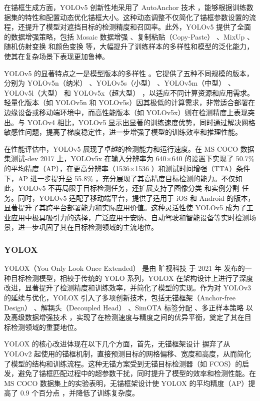 \documentclass[11pt,twocolumn]{ctexart}
\begin{document}
在锚框生成方面，YOLOv5 创新性地采用了 AutoAnchor 技术 ，能够根据训练数据集的特性和配置动态优化锚框大小。这种动态调整不仅简化了锚框参数设置的流程，还提升了模型对遮挡目标的检测精度和召回率。此外，YOLOv5 提供了全面的数据增强策略，包括 Mosaic 数据增强 、复制粘贴（Copy-Paste） 、MixUp 、随机仿射变换 和颜色变换 等，大幅提升了训练样本的多样性和模型的泛化能力，使其在复杂场景下表现更加鲁棒。

YOLOv5 的显著特点之一是模型版本的多样性 。它提供了五种不同规模的版本，分别为 YOLOv5n（纳米） 、YOLOv5s（小型） 、YOLOv5m（中型） 、YOLOv5l（大型） 和 YOLOv5x（超大型） ，以适应不同计算资源和应用需求。轻量化版本（如 YOLOv5n 和 YOLOv5s）因其极低的计算需求，非常适合部署在边缘设备或移动端环境中，而高性能版本（如 YOLOv5x）则在检测精度上表现突出。与 YOLOv4 相比，YOLOv5 显示出显著的训练速度优势，同时通过解决网格敏感性问题，提高了梯度稳定性，进一步增强了模型的训练效率和推理性能。

在性能评估中，YOLOv5 展现了卓越的检测能力和运行速度。在 MS COCO 数据集测试-dev 2017 上，YOLOv5x 在输入分辨率为 640×640 的设置下实现了 50.7\% 的平均精度（AP），在更高分辨率（1536×1536 ）和测试时间增强（TTA）条件下，AP 进一步提升至 55.8\% ，充分展现了其高精度目标检测的能力。不仅如此，YOLOv5 不再局限于目标检测任务，还扩展支持了图像分类 和实例分割 任务。同时，YOLOv5 适配了移动端平台，提供了适用于 iOS 和 Android 的版本，显著提升了其跨平台部署能力和实际应用价值。这种灵活性使 YOLOv5 成为了工业应用中极具吸引力的选择，广泛应用于安防、自动驾驶和智能设备等实时检测场景，进一步巩固了其在目标检测领域的主流地位。
\subsubsection{YOLOX}
YOLOX（You Only Look Once Extended）\cite{ge2021yolox} 是由 旷视科技 于 2021 年 发布的一种目标检测模型，相较于传统的 YOLO 系列，YOLOX 在架构设计上进行了深度改进，显著提升了检测精度和训练效率，并简化了模型的实现。作为对 YOLOv3 的延续与优化，YOLOX 引入了多项创新技术，包括无锚框架（Anchor-free Design） 、解耦头（Decoupled Head） 、SimOTA 标签分配 、多正样本策略 以及高级数据增强技术 ，实现了在检测速度与精度之间的优异平衡，奠定了其在目标检测领域的重要地位。

YOLOX 的核心改进体现在以下几个方面，首先，无锚框架设计 摒弃了从 YOLOv2 起使用的锚框机制，直接预测目标的网格偏移、宽度和高度，从而简化了模型的结构和训练流程。这种无锚方案受到无锚目标检测器（如 FCOS）的启发，避免了锚框匹配过程中的超参数干扰，同时提升了模型的效率和检测性能。在 MS COCO 数据集上的实验表明，无锚框架设计使 YOLOX 的平均精度（AP）提高了 0.9 个百分点 ，并降低了训练复杂度。
\end{document}
